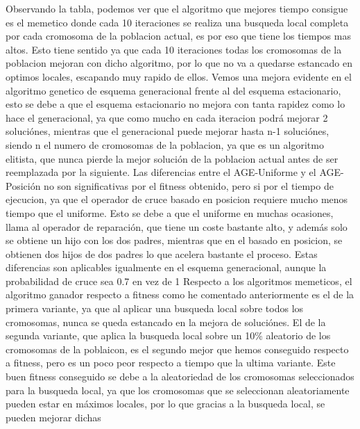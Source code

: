 \documentclass{article}
\begin{document}
Observando la tabla, podemos ver que el algoritmo que mejores tiempo consigue 
es el memetico donde cada 10 iteraciones se realiza una busqueda local completa por cada 
cromosoma de la poblacion actual, es por eso que tiene los tiempos mas altos.
Esto tiene sentido ya que cada 10 iteraciones todas los cromosomas de la poblacion 
mejoran con dicho algoritmo, por lo que no va a quedarse estancado en optimos locales, escapando 
muy rapido de ellos.
\vspace{3mm}
\newline Vemos una mejora evidente en el algoritmo genetico de esquema generacional frente al 
del esquema estacionario, esto se debe a que el esquema estacionario no mejora con tanta rapidez
como lo hace el generacional, ya que como mucho en cada iteracion podrá mejorar 2 soluciónes, mientras que el 
generacional puede mejorar hasta n-1 soluciónes, siendo n el numero de cromosomas de la poblacion, ya que es 
un algoritmo elitista, que nunca pierde la mejor solución de la poblacion actual antes de ser 
reemplazada por la siguiente.
\vspace{3mm}
\newline Las diferencias entre el AGE-Uniforme y el AGE-Posición no son significativas por el fitness 
obtenido, pero si por el tiempo de ejecucion, ya que el operador de cruce basado en posicion 
requiere mucho menos tiempo que el uniforme. Esto se debe a que el uniforme en muchas ocasiones,
llama al operador de reparación, que tiene un coste bastante alto, y además solo se obtiene 
un hijo con los dos padres, mientras que en el basado en posicion, se obtienen 
dos hijos de dos padres lo que acelera bastante el proceso.
Estas diferencias son aplicables igualmente en el esquema generacional, aunque la probabilidad
de cruce sea 0.7 en vez de 1
\vspace{3mm}
\newline Respecto a los algoritmos memeticos, el algoritmo ganador respecto a fitness como he 
comentado anteriormente es el de la primera variante, ya que al aplicar una busqueda local sobre todos 
los cromosomas, nunca se queda estancado en la mejora de soluciónes.
El de la segunda variante, que aplica la busqueda local sobre un 10\% aleatorio de los cromosomas 
de la poblaicon, es el segundo mejor que hemos conseguido respecto a fitness, pero es un poco peor respecto 
a tiempo que la ultima variante. Este buen fitness conseguido se debe a la aleatoriedad de los cromosomas
seleccionados para la busqueda local, ya que los cromosomas que se seleccionan aleatoriamente 
pueden estar en máximos locales, por lo que gracias a la busqueda local, se pueden mejorar dichas 
\end{document}
